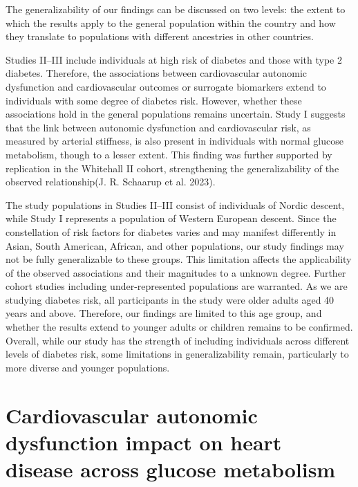 \documentclass[
  a4paper,
  headsepline=true,
  open=any]{scrbook}
\begin{document}
The generalizability of our findings can be discussed on two levels: the
extent to which the results apply to the general population within the
country and how they translate to populations with different ancestries
in other countries.

Studies II--III include individuals at high risk of diabetes and those
with type 2 diabetes. Therefore, the associations between cardiovascular
autonomic dysfunction and cardiovascular outcomes or surrogate
biomarkers extend to individuals with some degree of diabetes risk.
However, whether these associations hold in the general populations
remains uncertain. Study I suggests that the link between autonomic
dysfunction and cardiovascular risk, as measured by arterial stiffness,
is also present in individuals with normal glucose metabolism, though to
a lesser extent. This finding was further supported by replication in
the Whitehall II cohort, strengthening the generalizability of the
observed relationship(J. R. Schaarup et al. 2023).

The study populations in Studies II--III consist of individuals of
Nordic descent, while Study I represents a population of Western
European descent. Since the constellation of risk factors for diabetes
varies and may manifest differently in Asian, South American, African,
and other populations, our study findings may not be fully generalizable
to these groups. This limitation affects the applicability of the
observed associations and their magnitudes to a unknown degree. Further
cohort studies including under-represented populations are warranted. As
we are studying diabetes risk, all participants in the study were older
adults aged 40 years and above. Therefore, our findings are limited to
this age group, and whether the results extend to younger adults or
children remains to be confirmed. Overall, while our study has the
strength of including individuals across different levels of diabetes
risk, some limitations in generalizability remain, particularly to more
diverse and younger populations.

\hypertarget{cardiovascular-autonomic-dysfunction-impact-on-heart-disease-across-glucose-metabolism}{%
\section{Cardiovascular autonomic dysfunction impact on heart disease
across glucose
metabolism}\label{cardiovascular-autonomic-dysfunction-impact-on-heart-disease-across-glucose-metabolism}}
\end{document}
